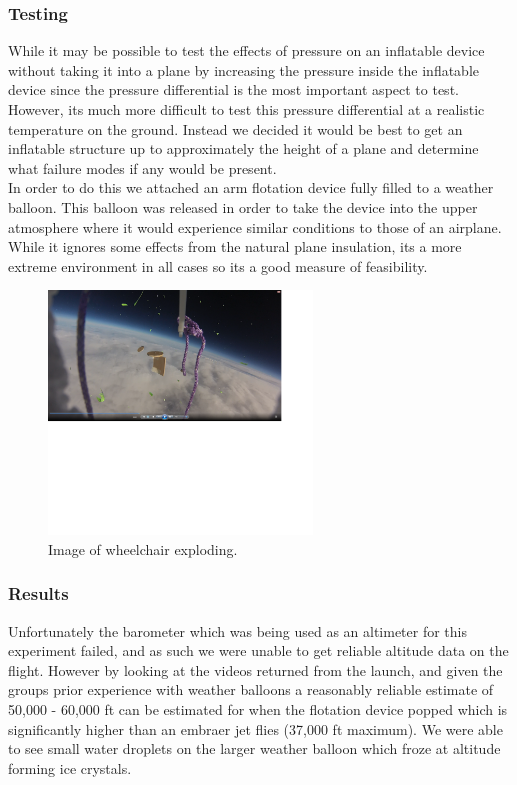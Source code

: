 \subsubsection{Testing}
While it may be possible to test the effects of pressure on an inflatable device without taking it into a plane by increasing the pressure inside the inflatable device since the pressure differential is the most important aspect to test. However, its much more difficult to test this pressure differential at a realistic temperature on the ground. Instead we decided it would be best to get an inflatable structure up to approximately the height of a plane and determine what failure modes if any would be present. \\

In order to do this we attached an arm flotation device fully filled to a weather balloon. This balloon was released in order to take the device into the upper atmosphere where it would experience similar conditions to those of an airplane. While it ignores some effects from the natural plane insulation, its a more extreme environment in all cases so its a good measure of feasibility. \\

\begin{figure}[h]
  \centering
     \includegraphics[width=7cm]{images/flying_wheelchair.png}
   \caption{Image of wheelchair exploding.}
  \label{fig:flying_wheelchair}
\end{figure}


\subsubsection{Results}
Unfortunately the barometer which was being used as an altimeter for this experiment failed, and as such we were unable to get reliable altitude data on the flight. However by looking at the videos returned from the launch, and given the groups prior experience with weather balloons a reasonably reliable estimate of 50,000 - 60,000 ft can be estimated for when the flotation device popped which is significantly higher than an embraer jet flies (37,000 ft maximum). We were able to see small water droplets on the larger weather balloon which froze at altitude forming ice crystals.


